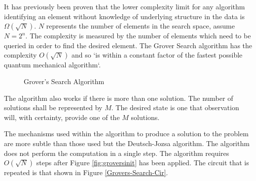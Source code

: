 It has previously been proven\cite{Bennett:1996iu} that the lower complexity limit for any algorithm identifying an element without knowledge of underlying structure in the data is $\Omega(\sqrt{N})$.
$N$ represents the number of elements in the search space, assume $N=2^n$.
The complexity is measured by the number of elements which need to be queried in order to find the desired element.
The Grover Search algorithm has the complexity $O(\sqrt{N})$ and so `is within a constant factor of the fastest possible quantum mechanical algorithm`\cite{Grover:1996rk}.
% 
\begin{figure}
\begin{center}

\hspace{20pt}
 
\end{center}
\caption{Grover's Search Algorithm}
\end{figure}


The algorithm also works if there is more than one solution.
The number of solutions shall be represented by $M$.
The desired state is one that observation will, with certainty, provide one of the $M$ solutions.

The mechanisms used within the algorithm to produce a solution to the problem are more subtle than those used but the Deutsch-Jozsa algorithm.
The algorithm does not perform the computation in a single step.
The algorithm requires $O(\sqrt{N})$ steps after Figure \ref{fig:groversinit} has been applied.
The circuit that is repeated is that shown in Figure \ref{Grovers-Search-Cir}.

